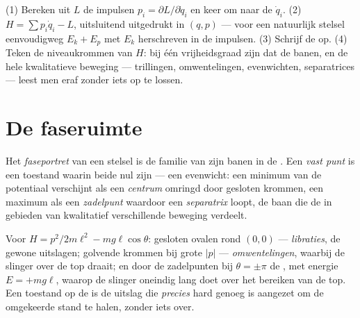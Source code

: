 \begin{method}\label{met:b3:hamiltonian-mechanics:recipe}
(1) Bereken uit $L$ de impulsen $p_i = \partial L/\partial\dot q_i$ en
keer om naar de $\dot q_i$. (2) $H = \sum p_i\dot q_i - L$, uitsluitend
uitgedrukt in $(q, p)$ --- voor een natuurlijk stelsel eenvoudigweg $E_k + E_p$ met $E_k$ herschreven in de impulsen. (3) Schrijf de  op. (4) Teken de niveaukrommen van $H$: bij één
vrijheidsgraad zijn dat de banen, en de hele kwalitatieve beweging ---
trillingen, omwentelingen, evenwichten, separatrices --- leest men eraf
zonder iets op te lossen.
\end{method}

\section{De faseruimte}

\begin{definition}\label{def:b3:hamiltonian-mechanics:portrait}
Het \emph{faseportret} van een stelsel is de familie van zijn banen in de
. Een \emph{vast punt} is een toestand waarin beide  nul zijn --- een evenwicht: een minimum van de potentiaal
verschijnt als een \emph{centrum} omringd door gesloten krommen, een
maximum als een \emph{zadelpunt} waardoor een \emph{separatrix} loopt, de
baan die de  in gebieden van kwalitatief verschillende beweging
verdeelt.
\end{definition}

\begin{example}\label{ex:b3:hamiltonian-mechanics:pendulum-portrait}
Voor $H = p^2/2m\ell^2 - mg\ell\cos\theta$: gesloten ovalen rond
$(0, 0)$ --- \emph{libraties}, de gewone uitslagen; golvende krommen bij
grote $|p|$ --- \emph{omwentelingen}, waarbij de slinger over de top
draait; en door de zadelpunten bij $\theta = \pm\pi$ de , met
energie $E = +mg\ell$, waarop de slinger oneindig lang doet over het
bereiken van de top. Een toestand op de  is de uitslag die
\emph{precies} hard genoeg is aangezet om de omgekeerde stand te halen,
zonder iets over.
\end{example}

